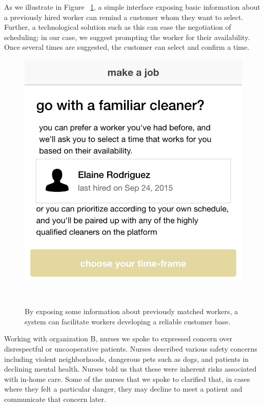 As we illustrate in Figure ~\ref{fig:previousHire},
a simple interface exposing basic information about a previously hired worker can remind a customer whom they want to select.
Further, a technological solution such as this can ease the negotiation of scheduling;
in our case, we suggest prompting the worker for their availability.
Once several times are suggested, the customer can select and confirm a time.


\begin{figure}[t]
\centering
  \includegraphics[width=1\columnwidth]{figures/recurrent}
    \caption{By exposing some information about previously matched workers,
    a system can facilitate workers developing a reliable customer base.}~\label{fig:previousHire}
\end{figure}

Working with organization B, nurses we spoke to expressed concern over disrespectful or uncooperative patients.
Nurses described various safety concerns including
violent neighborhoods, dangerous pets such as dogs, and patients in declining mental health.
Nurses told us that these were inherent risks associated with in-home care.
Some of the nurses that we spoke to clarified that, in cases where they felt a particular danger,
they may decline to meet a patient and communicate that concern later.

